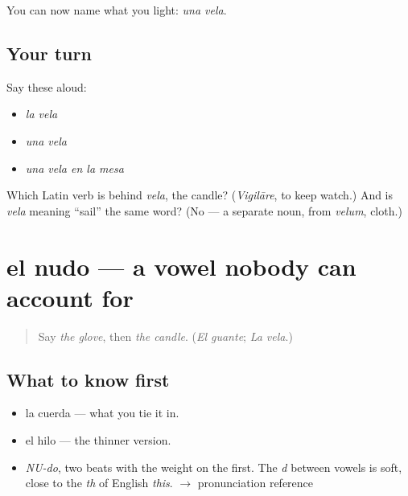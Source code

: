 \begin{grammarlens}[title={What you've built}]
You can now name what you light: \emph{una vela}.
\end{grammarlens}

\subsection*{Your turn}
Say these aloud:

\begin{itemize}
\raggedright
  \item \emph{la vela}
  \item \emph{una vela}
  \item \emph{una vela en la mesa}
\end{itemize}

\begin{tcolorbox}[breakable,colback=teal!4,colframe=teal!35!black,title={Before you move on}]
Which Latin verb is behind \emph{vela}, the candle? (\emph{Vigilāre}, to keep watch.) And is \emph{vela} meaning \textquotedblleft{}sail\textquotedblright{} the same word? (No — a separate noun, from \emph{velum}, cloth.)
\end{tcolorbox}
\section[el nudo]{el nudo — a vowel nobody can account for}

\label{lesson:ES-C374-nudo}



\begin{quote}
Say \emph{the glove}, then \emph{the candle}. (\emph{El guante}; \emph{La vela}.)
\end{quote}

\subsection*{What to know first}
\begin{itemize}
\raggedright
  \item la cuerda — what you tie it in.
  \item el hilo — the thinner version.
\end{itemize}

\begin{sounds}
\begin{itemize}
\raggedright
  \item \emph{NU-do}, two beats with the weight on the first. The \emph{d} between vowels is soft, close to the \emph{th} of English \emph{this}. $\to$ pronunciation reference
\end{itemize}
\end{sounds}

